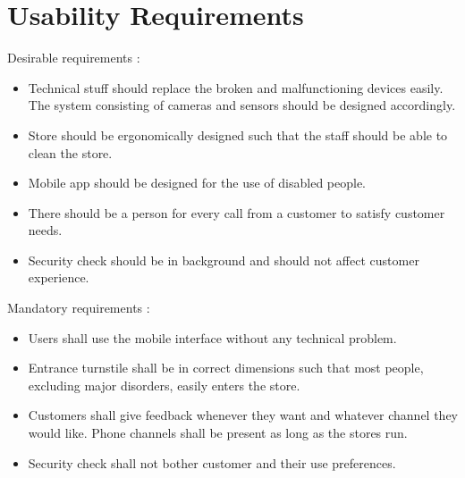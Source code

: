 \section{Usability Requirements}

Desirable requirements :
\begin{itemize}
    \item Technical stuff should replace the broken and malfunctioning devices easily. The system consisting of cameras and sensors should be designed accordingly.
    \item Store should be ergonomically designed such that the staff should be able to clean the store.
    \item Mobile app should be designed for the use of disabled people.
    \item There should be a person for every call from a customer to satisfy customer needs.
    \item Security check should be in background and should not affect customer experience.
\end{itemize}

Mandatory requirements :
\begin{itemize}
    \item Users shall use the mobile interface without any technical problem.
    \item Entrance turnstile shall be in correct dimensions such that most people, excluding major disorders, easily enters the store.
    \item Customers shall give feedback whenever they want and whatever channel they would like. Phone channels shall be present as long as the stores run.
    \item Security check shall not bother customer and their use preferences.
\end{itemize}